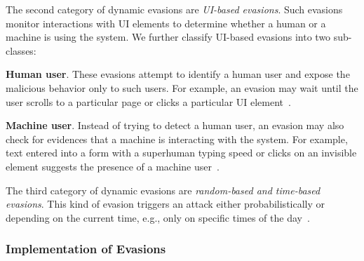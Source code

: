 \medskip
The second category of dynamic evasions are \emph{UI-based evasions}.
Such evasions monitor interactions with UI elements to determine whether a 
human or a machine is using the system.
We further classify UI-based evasions into two sub-classes:

\textbf{Human user}.
    These evasions attempt to identify a human user and expose the 
    malicious behavior only to such users.
    For example, an evasion may wait until the user scrolls to a 
    particular page or clicks a particular UI 
    element~\cite{userinteraction}.

\textbf{Machine user}.
    Instead of trying to detect a human user, an evasion may also check for 
    evidences that a machine is interacting with the system.
    For example, text entered into a form with a superhuman 
    typing speed or clicks on an invisible element suggests the presence of a machine 
    user~\cite{keragala2016detecting}.

\medskip
The third category of dynamic evasions are \emph{random-based and time-based 
evasions}.
This kind of evasion triggers an attack either probabilistically or 
depending on the current time, e.g., only on specific times of the 
day~\cite{timebased}.


\subsubsection{Implementation of Evasions}
\label{ss: combination of evasions}


